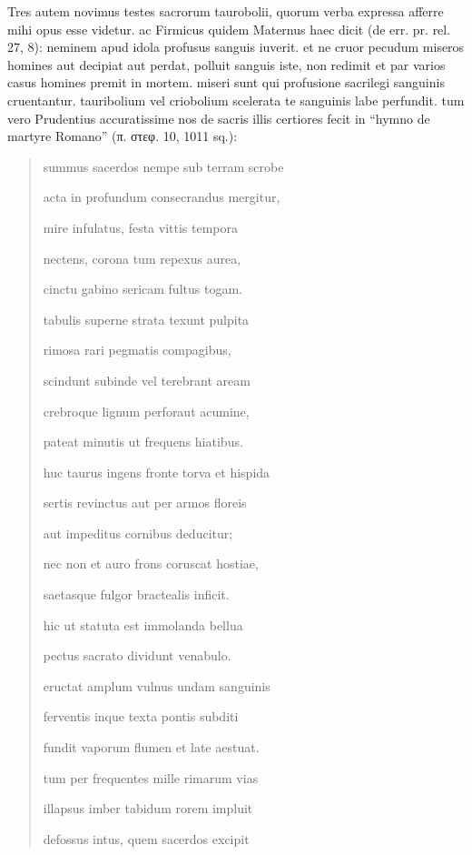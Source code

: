 \documentclass[a4paper, 11pt, oneside, polutonikogreek, german]{article}
\begin{document}
Tres autem novimus testes sacrorum taurobolii, quorum verba expressa afferre mihi opus esse videtur. ac Firmicus quidem Maternus haec dicit (de err. pr. rel. 27, 8): neminem apud idola profusus sanguis iuverit. et ne cruor pecudum miseros homines aut decipiat aut perdat, polluit sanguis iste, non redimit et par varios casus homines premit in mortem. miseri sunt qui profusione sacrilegi sanguinis cruentantur. tauribolium vel criobolium scelerata te sanguinis labe perfundit. tum vero Prudentius accuratissime nos de sacris illis certiores fecit in "`hymno de martyre Romano"' (π. στεφ. 10, 1011 sq.):
\begin{quotation}
summus sacerdos nempe sub terram scrobe

acta in profundum consecrandus mergitur,

mire infulatus, festa vittis tempora

nectens, corona tum repexus aurea,

cinctu gabino sericam fultus togam.

\bigskip

tabulis superne strata texunt pulpita

rimosa rari pegmatis compagibus,

scindunt subinde vel terebrant aream

crebroque lignum perforaut acumine,

pateat minutis ut frequens hiatibus.

\bigskip

huc taurus ingens fronte torva et hispida

sertis revinctus aut per armos floreis

aut impeditus cornibus deducitur;

nec non et auro frons coruscat hostiae,

saetasque fulgor bractealis inficit.

\bigskip

hic ut statuta est immolanda bellua

pectus sacrato dividunt venabulo.

eructat amplum vulnus undam sanguinis

ferventis inque texta pontis subditi

fundit vaporum flumen et late aestuat.

\bigskip

tum per frequentes mille rimarum vias

illapsus imber tabidum rorem impluit

defossus intus, quem sacerdos excipit


\end{quotation}
\end{document}
